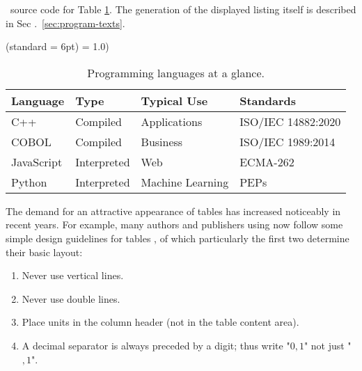 \begin{program}
    \caption{\latex\ source code for Table \ref{tab:programming-languages}.
    The generation of the displayed listing itself is described in Sec
    .~\ref{sec:program-texts}.}
    \label{prog:programming-languages-source}
%
    \begin{LaTeXCode}[numbers=none]
        \begin{table}
            \caption{Programming languages at a glance.}
            \label{tab:programming-languages}
            \centering
            \setlength{\tabcolsep}{10pt} %
            (standard = 6pt)
            \renewcommand{\arraystretch}{1.25} %
            = 1.0)
            \begin{tabular}{@{}llll@{}}
                \toprule
                Language & Type        & Typical Use      & Standards
                \\
                \midrule
                C++        & Compiled    & Applications     & ISO/IEC
                14882:2020 \\
                COBOL      & Compiled    & Business         & ISO/IEC
                1989:2014  \\
                JavaScript & Interpreted & Web              & ECMA-262
                \\
                Python     & Interpreted & Machine Learning & PEPs
                \\
                \bottomrule
            \end{tabular}
        \end{table}
    \end{LaTeXCode}
%
\end{program}

The demand for an attractive appearance of tables has increased noticeably in
recent years. For example, many authors and publishers using \latex now
follow some simple design guidelines for tables \cite{Fear2020}, of which
particularly the first two determine their basic layout:

\begin{enumerate}
    \item Never use vertical lines.
    \item Never use double lines.
    \item Place units in the column header (not in the table content area).
    \item A decimal separator is always preceded by a digit; thus write
    "$0{,}1$" not just "${,}1$".
\end{enumerate}


